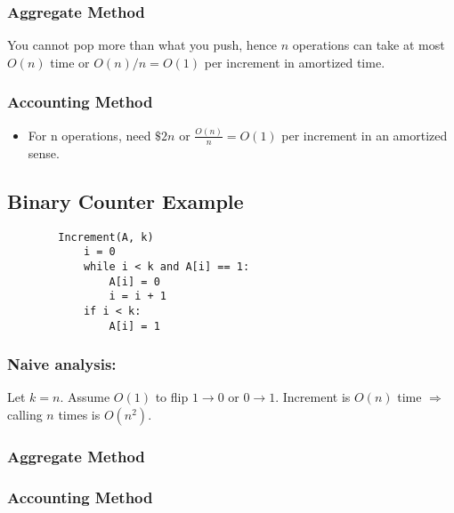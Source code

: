     \subsubsection{Aggregate Method}
    \begin{example}
        You cannot pop more than what you push, hence $n$ operations can take at most $O(n)$ time or $O(n)/n = O(1)$ per increment in amortized time.
    \end{example}
    
    \subsubsection{Accounting Method}
    \begin{example}
        \begin{itemize}
            \item For n operations, need $\$ 2n$ or $\frac{O(n)}{n}= O(1)$ per increment in an amortized sense. 
        \end{itemize}
    \end{example}
    
    \subsection{Binary Counter Example}
    \begin{example}
    \begin{lstlisting}
        Increment(A, k)
            i = 0
            while i < k and A[i] == 1:
                A[i] = 0
                i = i + 1
            if i < k:
                A[i] = 1
    \end{lstlisting}
    \end{example}

    \subsubsection{Naive analysis:}
    \begin{example}
        Let $k = n$. Assume $O(1)$ to flip $1 \rightarrow 0$ or $0 \rightarrow 1$. Increment is $O(n)$ time $\Rightarrow$ calling $n$ times is $O(n^2)$.
    \end{example}
    
    \subsubsection{Aggregate Method}
    \begin{example}
    \end{example}
    
    \subsubsection{Accounting Method}
    \begin{example}
    \end{example}